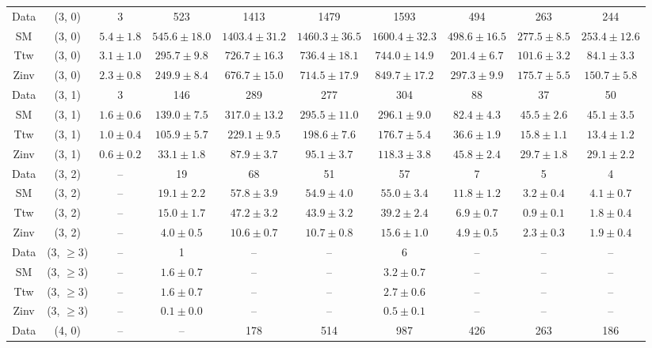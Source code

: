\begin{table}[h!]
{\begin{tabular}{cccccccccc}
	Data & (3, 0) & 3 & 523 & 1413 & 1479 & 1593 & 494 & 263 & 244 \\[0.5ex] 
	SM & (3, 0) & $5.4\pm 1.8$ & $545.6\pm 18.0$ & $1403.4\pm 31.2$ & $1460.3\pm 36.5$ & $1600.4\pm 32.3$ & $498.6\pm 16.5$ & $277.5\pm 8.5$ & $253.4\pm 12.6$ \\[0.5ex] 
	Ttw & (3, 0) & $3.1\pm 1.0$ & $295.7\pm 9.8$ & $726.7\pm 16.3$ & $736.4\pm 18.1$ & $744.0\pm 14.9$ & $201.4\pm 6.7$ & $101.6\pm 3.2$ & $84.1\pm 3.3$ \\[0.5ex] 
	Zinv & (3, 0) & $2.3\pm 0.8$ & $249.9\pm 8.4$ & $676.7\pm 15.0$ & $714.5\pm 17.9$ & $849.7\pm 17.2$ & $297.3\pm 9.9$ & $175.7\pm 5.5$ & $150.7\pm 5.8$ \\[0.5ex] 
	Data & (3, 1) & 3 & 146 & 289 & 277 & 304 & 88 & 37 & 50 \\[0.5ex] 
	SM & (3, 1) & $1.6\pm 0.6$ & $139.0\pm 7.5$ & $317.0\pm 13.2$ & $295.5\pm 11.0$ & $296.1\pm 9.0$ & $82.4\pm 4.3$ & $45.5\pm 2.6$ & $45.1\pm 3.5$ \\[0.5ex] 
	Ttw & (3, 1) & $1.0\pm 0.4$ & $105.9\pm 5.7$ & $229.1\pm 9.5$ & $198.6\pm 7.6$ & $176.7\pm 5.4$ & $36.6\pm 1.9$ & $15.8\pm 1.1$ & $13.4\pm 1.2$ \\[0.5ex] 
	Zinv & (3, 1) & $0.6\pm 0.2$ & $33.1\pm 1.8$ & $87.9\pm 3.7$ & $95.1\pm 3.7$ & $118.3\pm 3.8$ & $45.8\pm 2.4$ & $29.7\pm 1.8$ & $29.1\pm 2.2$ \\[0.5ex] 
	Data & (3, 2) & -- & 19 & 68 & 51 & 57 & 7 & 5 & 4 \\[0.5ex] 
	SM & (3, 2) & -- & $19.1\pm 2.2$ & $57.8\pm 3.9$ & $54.9\pm 4.0$ & $55.0\pm 3.4$ & $11.8\pm 1.2$ & $3.2\pm 0.4$ & $4.1\pm 0.7$ \\[0.5ex] 
	Ttw & (3, 2) & -- & $15.0\pm 1.7$ & $47.2\pm 3.2$ & $43.9\pm 3.2$ & $39.2\pm 2.4$ & $6.9\pm 0.7$ & $0.9\pm 0.1$ & $1.8\pm 0.4$ \\[0.5ex] 
	Zinv & (3, 2) & -- & $4.0\pm 0.5$ & $10.6\pm 0.7$ & $10.7\pm 0.8$ & $15.6\pm 1.0$ & $4.9\pm 0.5$ & $2.3\pm 0.3$ & $1.9\pm 0.4$ \\[0.5ex] 
	Data & (3, $\ge3$) & -- & 1 & -- & -- & 6 & -- & -- & -- \\[0.5ex] 
	SM & (3, $\ge3$) & -- & $1.6\pm 0.7$ & -- & -- & $3.2\pm 0.7$ & -- & -- & -- \\[0.5ex] 
	Ttw & (3, $\ge3$) & -- & $1.6\pm 0.7$ & -- & -- & $2.7\pm 0.6$ & -- & -- & -- \\[0.5ex] 
	Zinv & (3, $\ge3$) & -- & $0.1\pm 0.0$ & -- & -- & $0.5\pm 0.1$ & -- & -- & -- \\[0.5ex] 
	Data & (4, 0) & -- & -- & 178 & 514 & 987 & 426 & 263 & 186 \\[0.5ex] 

\end{tabular}}
\end{table}
